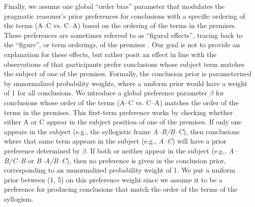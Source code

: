 \documentclass[floatsintext, man]{apa6}
\begin{document}
Finally, we assume one global ``order bias'' parameter that modulates the pragmatic reasoner's prior preferences for conclusions with a specific ordering of the terms (A--C vs. C--A) based on the ordering of the terms in the premises. 
These preferences are sometimes referred to as ``figural effects'', tracing back to the ``figure'', or term orderings, of the premises \cite{Wetherick1990, rips1994}.
Our goal is not to provide an explanation for these effects, but rather posit an effect in line with the observations of  that participants prefer conclusions whose subject term matches the subject of one of the premises.
Formally, the conclusion prior is parameterized by unnormalized probability weights, where a uniform prior would have a weight of 1 for all conclusions. 
We introduce a global preference  parameter $\beta$ for conclusions whose order of the terms (A--C vs. C--A) matches the order of the terms in the premises.
This first-term preference works by checking whether either A or C appear in the subject position of one of the premises.
If only one appears in the subject (e.g., the syllogistic frame \emph{A--B/B--C}), then conclusions where that same term appears in the subject (e.g., \emph{A--C}) will have a prior preference determined by $\beta$.
If both or neither appear in the subject (e.g., \emph{A--B/C--B} or \emph{B--A/B--C}), then no preference is given in the conclusion prior, corresponding to an unnormalized probability weight of 1. 
We put a uniform prior between (1, 5) on this preference weight since we assume it to be a preference for producing conclusions that match the order of the terms of the syllogism. 
\end{document}

